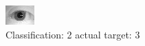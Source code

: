 \begin{figure}[h!]
\begin{center}
\includegraphics[width=0.60\columnwidth]{figures/ID1050_class_2_target_3.png}
\end{center}
\caption{ Classification: 2 actual target: 3}
\label{fig:ID1050_class_2_target_3}
\end{figure}
